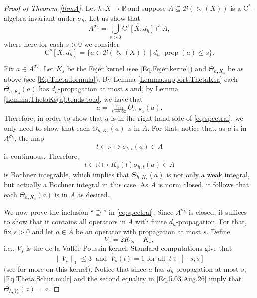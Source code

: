 \documentclass[11pt]{amsart}
\newcommand{\R}{\mathbb{R}}
\newcommand{\cB}{\mathcal{B}}
\newcommand{\cstar}{$\mathrm{C}^*$}
\numberwithin{equation}{section}
\theoremstyle{definition}
\theoremstyle{remark}
\DeclareMathOperator{\propg}{prop}
\begin{document}
\begin{proof}  [Proof of Theorem \ref{thmA}]
Let $h\colon X\to \R$ and suppose $A\subseteq \cB(\ell_2(X))$ is a \cstar-algebra invariant under $\sigma_h$. Let us show that 
\begin{equation}\label{eq:spectral}
A^{\sigma_h}=\overline{\bigcup_{s>0}\mathrm C^s[X,d_h]\cap A},
\end{equation}
where here for each $s>0$ we consider 
\begin{equation}\label{Eq.21.sep.26.1}\mathrm C^s[X,d_h]=\{a\in \cB(\ell_2(X))\mid d_h\text{-}\propg(a)\leq s\}.\end{equation}

Fix $a\in A^{\sigma_h}$. Let  $K_s$ be the  Fejér kernel (see \eqref{Eq.Fejér.kernel}) and   $\Theta_{h,K_s}$ be as above (see \eqref{Eq.Theta.formula}). By Lemma \ref{Lemma.support.ThetaKsa} each $\Theta_{h,K_s}(a)$ has $d_h$-propagation at most $s$ and, by Lemma \ref{Lemma.ThetaKs(a).tends.to.a}, we have that
\[a=\lim_{s\to \infty}\Theta_{h,K_s}(a).\]
Therefore, in order to show that $a$ is in the right-hand side of \eqref{eq:spectral}, we only need to show that each $\Theta_{h,K_s}(a)$ is in $A$. For that, notice that,   as $a$ is in $A^{\sigma_h}$, the map
\[t\in \R\mapsto \sigma_{h,t}(a)\in A\] is continuous. Therefore,
\[t\in \R\mapsto K_s(t)\sigma_{h,t}(a)\in A\]
 is Bochner integrable, which implies that  $\Theta_{h,K_s}(a)$ is not only a weak integral, but actually a Bochner integral in this case. As $A$ is norm closed, it follows that each $\Theta_{h,K_s}(a)$ is in $A$ as desired.







We now prove the inclusion ``$\supseteq$'' in \eqref{eq:spectral}. Since $A^{\sigma_h}$ is closed,  it suffices to show that    it   contains all operators in $A$ with finite $d_h$-propagation. For that, fix $s>0$ and let $a\in A $ be an operator with propagation at most $s$. Define \[V_s=2K_{2s}-K_s,\] i.e., $V_s$ is the  de la Vall\'ee Poussin kernel. Standard computations give that
\begin{equation}\label{Eq.5.03.Aug.26}\|V_s\|_1\leq 3\ \text{ and }\   \hat V_s(t)= 1 \text{ for all }\ t\in [-s,s]\end{equation}
(see \cite{Katznelson2004} for more on this kernel). Notice that since  $a$ has $d_h$-propagation at most $s$,   \eqref{Eq.Theta.Schur.mult} and the second equality in \eqref{Eq.5.03.Aug.26} imply that   $\Theta_{h,V_s}(a)=a$.


\end{proof}
\end{document}
